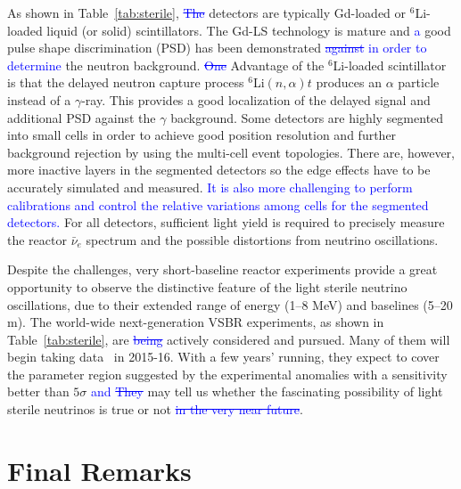 \documentclass[aps,twocolumn,preprintnumbers,amsmath,superscriptaddress,amssymb,floats,nofootinbib]{revtex4-1}
\begin{document}
As shown in Table~\ref{tab:sterile}, \textcolor{blue}{\st{The}} detectors are typically Gd-loaded or $^{6}$Li-loaded liquid (or solid) scintillators. 
The Gd-LS technology is mature and \textcolor{blue}{a} good pulse shape discrimination (PSD) has been demonstrated 
\textcolor{blue}{\st{against} in order to determine} the neutron background. 
\textcolor{blue}{\st{One}} Advantage of the $^{6}$Li-loaded scintillator is that the 
delayed neutron capture process $^{6}$Li$(n,\alpha)t$ produces an $\alpha$ particle instead of a $\gamma$-ray. 
This provides a good localization of the delayed signal and additional PSD against the $\gamma$ background. 
Some detectors are highly segmented into small cells in order to achieve good position resolution and further background rejection by using the multi-cell event topologies. 
There are, however, more inactive layers in the segmented detectors so the edge effects have to be accurately simulated and measured.
\textcolor{blue}{It is also more challenging to perform calibrations and control the relative variations among cells for the segmented detectors.} 
For all detectors, sufficient light yield is required to precisely measure the reactor $\bar\nu_e$ spectrum and the possible distortions from neutrino oscillations.


Despite the challenges, very short-baseline reactor experiments provide a great opportunity to observe the distinctive feature of the light sterile neutrino oscillations, due to their extended range of energy (1--8 MeV) and baselines (5--20 m). 
The world-wide next-generation VSBR experiments, as shown in Table~\ref{tab:sterile}, are \textcolor{blue}{\st{being}} actively considered and pursued.
Many of them will begin taking data~\cite{Lhuillier-Neutrino14} in 2015-16. With a few years' running, they expect to cover the parameter region 
suggested by the experimental anomalies with a sensitivity better than $5\sigma$ \textcolor{blue}{and} 
\textcolor{blue}{\st{They}} may tell us whether the fascinating possibility of light sterile neutrinos is true or not \textcolor{blue}{\st{in the very near future}}.


\section{Final Remarks} 
\label{sec:final}
\end{document}
